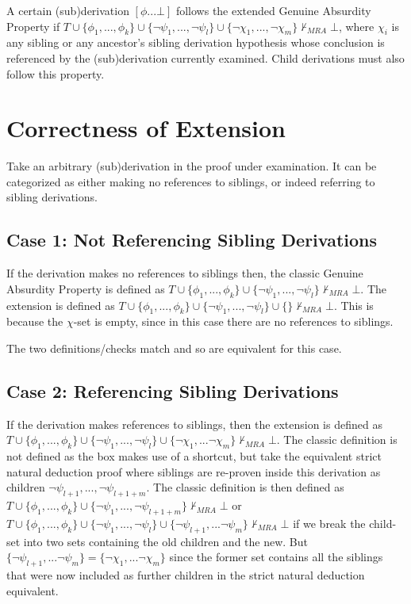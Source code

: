 \documentclass[11pt,twoside,a4paper]{report}
\begin{document}
A certain (sub)derivation $[\phi ... \bot]$ follows the extended Genuine Absurdity Property if $T\cup\{\phi_1, ..., \phi_k\}\cup\{\neg\psi_1, ..., \neg\psi_l\}\cup\{\neg\chi_1, ..., \neg\chi_m\}\nvdash_{MRA}\bot$, where $\chi_i$ is any sibling or any ancestor's sibling derivation hypothesis whose conclusion is referenced by the (sub)derivation currently examined. Child derivations must also follow this property.

\section{Correctness of Extension}
Take an arbitrary (sub)derivation in the proof under examination. It can be categorized as either making no references to siblings, or indeed referring to sibling derivations.

\subsection{Case 1: Not Referencing Sibling Derivations}
If the derivation makes no references to siblings then, the classic Genuine Absurdity Property is defined as $T\cup\{\phi_1, ..., \phi_k\}\cup\{\neg\psi_1, ..., \neg\psi_l\}\nvdash_{MRA}\bot$. The extension is defined as $T\cup\{\phi_1, ..., \phi_k\}\cup\{\neg\psi_1, ..., \neg\psi_l\}\cup\{\}\nvdash_{MRA}\bot$. This is because the $\chi$-set is empty, since in this case there are no references to siblings.

The two definitions/checks match and so are equivalent for this case.

\subsection{Case 2: Referencing Sibling Derivations}
If the derivation makes references to siblings, then the extension is defined as $T\cup\{\phi_1, ..., \phi_k\}\cup\{\neg\psi_1, ..., \neg\psi_l\}\cup\{\neg\chi_1, ... \neg\chi_m\}\nvdash_{MRA}\bot$. The classic definition is not defined as the box makes use of a shortcut, but take the equivalent strict natural deduction proof where siblings are re-proven inside this derivation as children $\neg\psi_{l+1}, ..., \neg\psi_{l+1+m}$. The classic definition is then defined as $T\cup\{\phi_1, ..., \phi_k\}\cup\{\neg\psi_1, ..., \neg\psi_{l+1+m}\}\nvdash_{MRA}\bot$ or $T\cup\{\phi_1, ..., \phi_k\}\cup\{\neg\psi_1, ..., \neg\psi_l\}\cup\{\neg\psi_{l+1}, ... \neg\psi_m\}\nvdash_{MRA}\bot$ if we break the child-set into two sets containing the old children and the new. But $\{\neg\psi_{l+1}, ... \neg\psi_m\} = \{\neg\chi_1, ... \neg\chi_m\}$ since the former set contains all the siblings that were now included as further children in the strict natural deduction equivalent.
\end{document}
